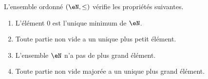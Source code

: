 \begin{proposition}     \label{PROPooMZOWooHmsXzI}
    L'ensemble ordonné \( (\eN,\leq)\) vérifie les propriétés suivantes.
    \begin{enumerate}
        \item       \label{ITEMooJLAHooDKukfH}
            L'élément \( 0\) est l'unique minimum de \( \eN\).
        \item       \label{ITEMooYAJIooEFmOpB}
            Toute partie non vide a un unique plus petit élément.
        \item       \label{ITEMooSRGOooNYJJHY}
            L'ensemble \( \eN\) n'a pas de plus grand élément.
        \item       \label{ITEMooKIHZooDRTCdx}
            Toute partie non vide majorée a un unique plus grand élément.
    \end{enumerate}
\end{proposition}


